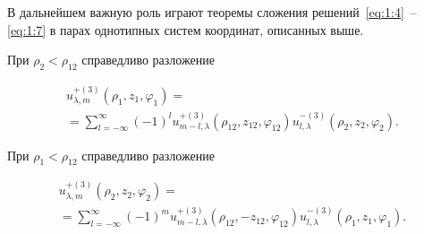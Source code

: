 В дальнейшем важную роль играют теоремы сложения решений~\eqref{eq:1:4}~-- \eqref{eq:1:7} в парах однотипных систем координат, описанных выше.

\begin{theorem}
При ${\rho _2} < {\rho _{12}}$ справедливо разложение

\begin{multline}\label{eq:1:8}
u_{\lambda ,m}^{ + (3)}\left( {{\rho _1},{z_1},{\varphi _1}} \right) = \\
= \sum\limits_{l =  - \infty }^\infty  {{{( - 1)}^l}} u_{m - l,\lambda }^{ + (3)}\left( {{\rho _{12}},{z_{12}},{\varphi _{12}}} \right)u_{l,\lambda }^{ - (3)}\left( {{\rho _2},{z_2},{\varphi _2}} \right).
\end{multline}

При ${\rho _1} < {\rho _{12}}$ справедливо разложение

\begin{multline}\label{eq:1:9}
u_{\lambda ,m}^{ + (3)}\left( {{\rho _2},{z_2},{\varphi _2}} \right) = \\
= \sum\limits_{l =  - \infty }^\infty  {{{( - 1)}^m}} u_{m - l,\lambda }^{ + (3)}\left( {{\rho _{12}}, - {z_{12}},{\varphi _{12}}} \right)u_{l,\lambda }^{ - (3)}\left( {{\rho _1},{z_1},{\varphi _1}} \right).
\end{multline}

\end{theorem}

